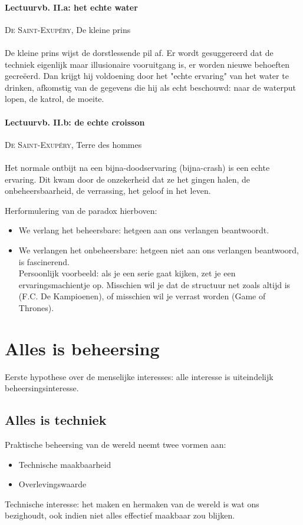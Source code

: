 \documentclass[11pt,a4paper]{article}
\begin{document}
\paragraph{Lectuurvb. II.a: het echte water} \textsc{De Saint-Exup\'ery}, De kleine prins
\\ \\
De kleine prins wijst de dorstlessende pil af. Er wordt gesuggereerd dat de techniek eigenlijk maar illusionaire vooruitgang is, er worden nieuwe behoeften gecre\"eerd. Dan krijgt hij voldoening door het "echte ervaring" van het water te drinken, afkomstig van de gegevens die hij als echt beschouwd: naar de waterput lopen, de katrol, de moeite.

\paragraph{Lectuurvb. II.b: de echte croisson} \textsc{De Saint-Exup\'ery}, Terre des hommes
\\ \\
Het normale ontbijt na een bijna-doodservaring (bijna-crash) is een echte ervaring. Dit kwam door de onzekerheid dat ze het gingen halen, de onbeheersbaarheid, de verrassing, het geloof in het leven.

Herformulering van de paradox hierboven:

\begin{itemize}
	\item We verlang het beheersbare: hetgeen aan ons verlangen beantwoordt. 
	\item We verlangen het onbeheersbare: hetgeen niet aan ons verlangen beantwoord, is fascinerend.
	\\ Persoonlijk voorbeeld: als je een serie gaat kijken, zet je een ervaringsmachientje op. Misschien wil je dat de structuur net zoals altijd is (F.C. De Kampioenen), of misschien wil je verrast worden (Game of Thrones).
\end{itemize}

\section{Alles is beheersing}
Eerste hypothese over de menselijke interesses: alle interesse is uiteindelijk beheersingsinteresse.

\subsection{Alles is techniek}
Praktische beheersing van de wereld neemt twee vormen aan:
\begin{itemize}
\item Technische maakbaarheid
\item Overlevingswaarde
\end{itemize}
Technische interesse: het maken en hermaken van de wereld is wat ons bezighoudt, ook indien niet alles effectief maakbaar zou blijken.
\end{document}

